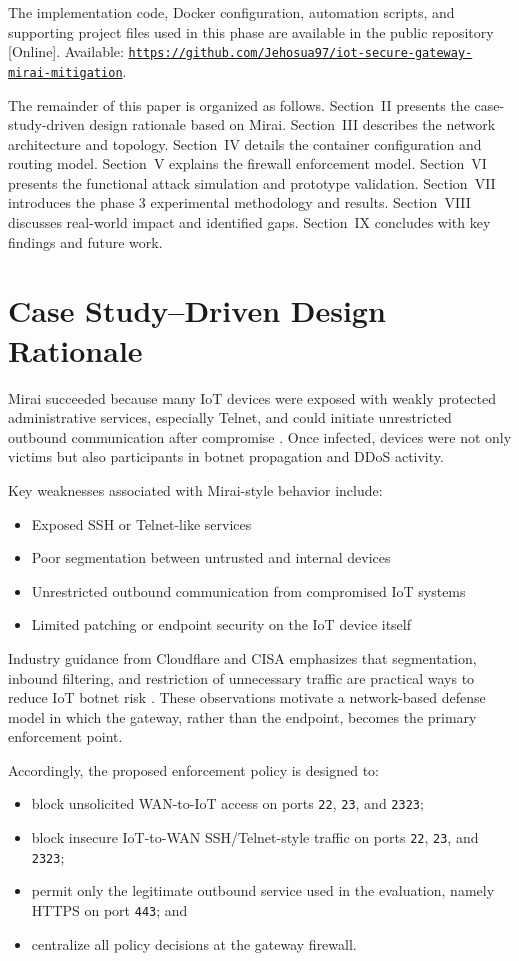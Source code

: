 \documentclass[journal]{IEEEtran}
\begin{document}
The implementation code, Docker configuration, automation scripts, and supporting project files used in this phase are available in the public repository [Online]. Available: \href{https://github.com/Jehosua97/iot-secure-gateway-mirai-mitigation}{\nolinkurl{https://github.com/Jehosua97/iot-secure-gateway-mirai-mitigation}}.

The remainder of this paper is organized as follows. Section~II presents the case-study-driven design rationale based on Mirai. Section~III describes the network architecture and topology. Section~IV details the container configuration and routing model. Section~V explains the firewall enforcement model. Section~VI presents the functional attack simulation and prototype validation. Section~VII introduces the phase 3 experimental methodology and results. Section~VIII discusses real-world impact and identified gaps. Section~IX concludes with key findings and future work.

\section{Case Study--Driven Design Rationale}
Mirai succeeded because many IoT devices were exposed with weakly protected administrative services, especially Telnet, and could initiate unrestricted outbound communication after compromise \cite{mirai_usenix}. Once infected, devices were not only victims but also participants in botnet propagation and DDoS activity.

Key weaknesses associated with Mirai-style behavior include:
\begin{itemize}
\item Exposed SSH or Telnet-like services
\item Poor segmentation between untrusted and internal devices
\item Unrestricted outbound communication from compromised IoT systems
\item Limited patching or endpoint security on the IoT device itself
\end{itemize}

Industry guidance from Cloudflare and CISA emphasizes that segmentation, inbound filtering, and restriction of unnecessary traffic are practical ways to reduce IoT botnet risk \cite{cloudflare_mirai, cisa_mirai}. These observations motivate a network-based defense model in which the gateway, rather than the endpoint, becomes the primary enforcement point.

Accordingly, the proposed enforcement policy is designed to:
\begin{itemize}
\item block unsolicited WAN-to-IoT access on ports \texttt{22}, \texttt{23}, and \texttt{2323};
\item block insecure IoT-to-WAN SSH/Telnet-style traffic on ports \texttt{22}, \texttt{23}, and \texttt{2323};
\item permit only the legitimate outbound service used in the evaluation, namely HTTPS on port \texttt{443}; and
\item centralize all policy decisions at the gateway firewall.
\end{itemize}
\end{document}
